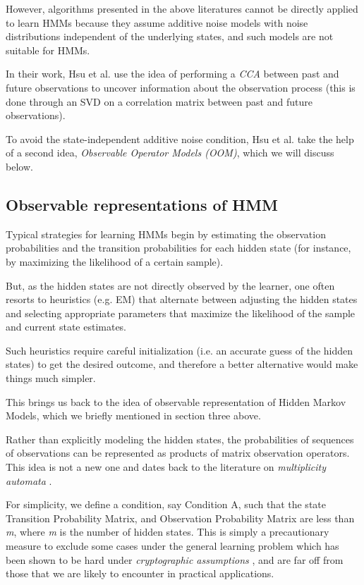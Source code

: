 However, algorithms presented in the above literatures cannot be directly
applied to learn HMMs because they assume additive noise models with noise distributions independent of the underlying states, and such models are not suitable for HMMs.

In their work, Hsu et al.\cite{ref2} use the idea of performing a \textit{CCA} between past and future observations to uncover information about the observation process (this is done through
an SVD on a correlation matrix between past and future observations).

To avoid the state-independent additive noise condition, Hsu et al.\cite{ref2} take the help of a second idea, \textit{Observable Operator Models (OOM)}, which we will discuss below.

\subsection{Observable representations of HMM}

Typical strategies for learning HMMs begin by estimating the observation probabilities and the transition probabilities for each hidden state (for instance, by maximizing the likelihood of a certain sample).

But, as the hidden states are not directly observed by the learner, one often resorts to heuristics (e.g. EM) that alternate
between adjusting the hidden states and selecting appropriate parameters that maximize the likelihood of the sample and current state estimates. 

Such heuristics require careful initialization (i.e. an accurate guess of the hidden states) to get the desired outcome, and therefore a better alternative would make things much simpler. 

This brings us back to the idea of observable representation of Hidden Markov Models, which we briefly mentioned in section three above.

Rather than explicitly modeling the hidden states, the probabilities of sequences of observations can be represented as products of matrix observation operators. This idea is not a new one and dates back to
the literature on \textit{multiplicity automata} \cite{ref15} \cite{ref16}.

For simplicity, we define a condition, say Condition A, such that the state Transition Probability Matrix, and Observation Probability Matrix are less than \textit{m}, where \textit{m} is the number of hidden states. This is simply a precautionary measure to exclude some cases under the general learning problem which has been shown to be hard under \textit{cryptographic assumptions} \cite{ref18}, and are far off from those that we are likely to encounter in practical applications.



